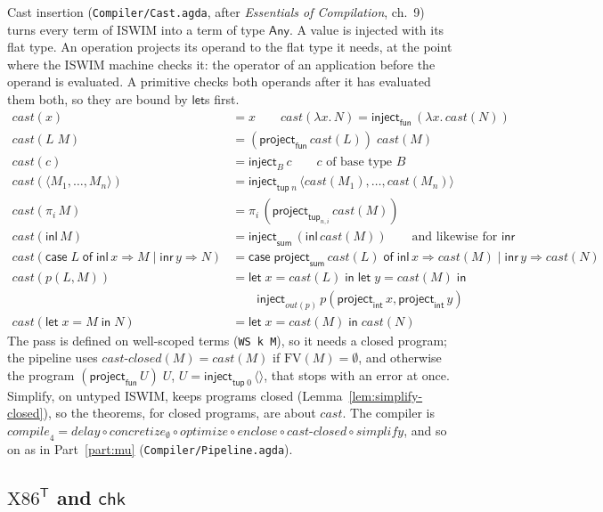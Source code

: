 \documentclass[10pt]{article}
\theoremstyle{acmplain}
\newcommand{\key}[1]{\mathsf{#1}}
\newcommand{\pass}[1]{\mathit{#1}}
\newcommand{\lam}[1]{\lambda #1.\,}
\newcommand{\Let}{\key{let}\;}
\newcommand{\In}{\;\key{in}\;}
\newcommand{\inl}{\key{inl}\,}
\newcommand{\Case}[5]{\key{case}\;#1\;\key{of}\;\key{inl}\,#2 \Rightarrow #3 \mid \key{inr}\,#4 \Rightarrow #5}
\newcommand{\tuple}[1]{\langle #1 \rangle}
\newcommand{\prj}[1]{\pi_{#1}\,}
\newcommand{\emptytup}{\langle\rangle}
\newcommand{\prim}[3]{#1(#2, #3)}
\newcommand{\FV}{\mathrm{FV}}
\newcommand{\Tl}[1]{\textrm{#1}^{\mathsf{T}}}  %
\newcommand{\TAny}{\key{Any}}
\newcommand{\Tfun}{\key{fun}}                  %
\newcommand{\Tsum}{\key{sum}}                  %
\newcommand{\Ttup}[1]{\key{tup}\;#1}           %
\newcommand{\Tint}{\key{int}}                  %
\newcommand{\Tttup}[2]{\key{tup}_{#1,#2}}      %
\newcommand{\Tout}[1]{\mathit{out}(#1)}        %
\newcommand{\Tinject}[1]{\key{inject}_{#1}\,}
\newcommand{\Tproject}[1]{\key{project}_{#1}\,}
\newcommand{\Tunit}{\Tinject{\Ttup{0}}\emptytup}  %
\begin{document}
Cast insertion (\texttt{Compiler/Cast.agda}, after \emph{Essentials of
Compilation}, ch.~9) turns every term of ISWIM into a term of type $\TAny$.
A value is injected with its flat type. An operation projects its operand
to the flat type it needs, at the point where the ISWIM machine checks it:
the operator of an application before the operand is evaluated. A primitive
checks both operands after it has evaluated them both, so they are bound by
$\key{let}$s first.
\begin{align*}
  \pass{cast}(x) &= x \qquad
  \pass{cast}(\lam{x} N) = \Tinject{\Tfun}(\lam{x} \pass{cast}(N)) \\
  \pass{cast}(L\;M) &= (\Tproject{\Tfun} \pass{cast}(L))\; \pass{cast}(M) \\
  \pass{cast}(c) &= \Tinject{B} c \qquad c \text{ of base type } B \\
  \pass{cast}(\tuple{M_1,\ldots,M_n}) &= \Tinject{\Ttup{n}}
    \tuple{\pass{cast}(M_1),\ldots,\pass{cast}(M_n)} \\
  \pass{cast}(\prj{i} M) &= \prj{i} (\Tproject{\Tttup{n}{i}} \pass{cast}(M)) \\
  \pass{cast}(\inl M) &= \Tinject{\Tsum} (\inl \pass{cast}(M))
    \qquad\text{and likewise for } \key{inr} \\
  \pass{cast}(\Case{L}{x}{M}{y}{N}) &=
    \Case{\Tproject{\Tsum} \pass{cast}(L)}{x}{\pass{cast}(M)}{y}{\pass{cast}(N)} \\
  \pass{cast}(\prim{p}{L}{M}) &= \Let x = \pass{cast}(L) \In \Let y = \pass{cast}(M) \In \\
    &\qquad \Tinject{\Tout{p}} \prim{p}{\Tproject{\Tint} x}{\Tproject{\Tint} y} \\
  \pass{cast}(\Let x = M \In N) &= \Let x = \pass{cast}(M) \In \pass{cast}(N)
\end{align*}
The pass is defined on well-scoped terms (\texttt{WS k M}), so it needs a
closed program; the pipeline uses $\pass{cast\text{-}closed}(M) =
\pass{cast}(M)$ if $\FV(M) = \emptyset$, and otherwise the program
$(\Tproject{\Tfun} U)\; U$, $U = \Tunit$, that stops with an error at once.
Simplify, on untyped ISWIM, keeps programs closed
(Lemma~\ref{lem:simplify-closed}), so the theorems, for closed programs,
are about $\pass{cast}$. The compiler is
$\pass{compile}_4 = \pass{delay} \circ \pass{concretize}_{\emptyset} \circ
\pass{optimize} \circ \pass{enclose} \circ \pass{cast\text{-}closed} \circ
\pass{simplify}$, and so on as in Part~\ref{part:mu}
(\texttt{Compiler/Pipeline.agda}).

\subsection{\texorpdfstring{$\Tl{X86}$}{X86-T} and \texorpdfstring{$\key{chk}$}{chk}}\label{sec:t-x86}
\end{document}
